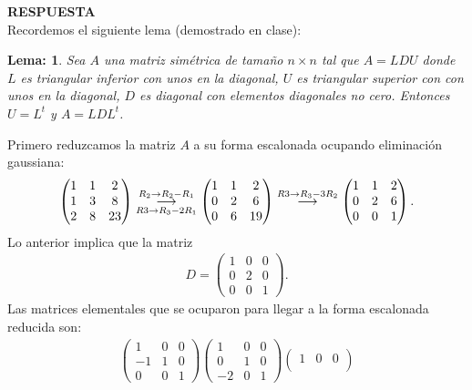 \documentclass[11pt,letterpaper]{article}
\newcommand{\res}{\textbf{RESPUESTA}\\}
\newcommand{\grstep}[2][\relax]{%
   \ensuremath{\mathrel{
       {\mathop{\longrightarrow}\limits^{#2\mathstrut}_{
                                     \begin{subarray}{l} #1 \end{subarray}}}}}}
\newtheorem{thml}{Lema:}
\begin{document}
\begin{enumerate}
\res
Recordemos el siguiente lema (demostrado en clase):
\begin{framed}
    \begin{thml} \label{simetrica_LDLt}
    Sea $A$ una matriz simétrica de tamaño $n\times n$ tal que $A=LDU$ donde $L$ es triangular inferior con unos en la diagonal, $U$ es triangular superior con con unos en la diagonal, $D$ es diagonal con elementos diagonales no cero. Entonces $U=L^t$ y $A=LDL^t$.
    \end{thml}
\end{framed} 
Primero reduzcamos la matriz $A$ a su forma escalonada ocupando eliminación gaussiana:
\begin{align}\label{positiva}
\begin{pmatrix}
1 & 1 & 2 \\
1 & 3 & 8\\
2 & 8 & 23
\end{pmatrix}%
\grstep[R3 \rightarrow R_3-2R_1]{R_2 \rightarrow R_2-R_1}
%
\begin{pmatrix}
1 & 1 & 2 \\
0 & 2 & 6\\
0 & 6 & 19
\end{pmatrix}%
\grstep[]{R3 \rightarrow R_3-3R_2}
%
\begin{pmatrix}
1 & 1 & 2 \\
0 & 2 & 6\\
0 & 0 & 1
\end{pmatrix}.
\end{align}
Lo anterior implica que la matriz 
\begin{align*}
D=\begin{pmatrix}
1 & 0 & 0 \\
0 & 2 & 0\\
0 & 0 & 1
\end{pmatrix}.
\end{align*}
Las matrices elementales que se ocuparon para llegar a la forma escalonada reducida son:
\begin{align*}
\begin{pmatrix}
 1 & 0 & 0 \\
-1 & 1 & 0\\
 0 & 0 & 1
\end{pmatrix}
\begin{pmatrix}
 1 & 0 & 0 \\
 0 & 1 & 0\\
-2 & 0 & 1
\end{pmatrix}
\begin{pmatrix}
1 & 0 & 0 \\

\end{pmatrix}
\end{align*}
\end{enumerate}
\end{document}
